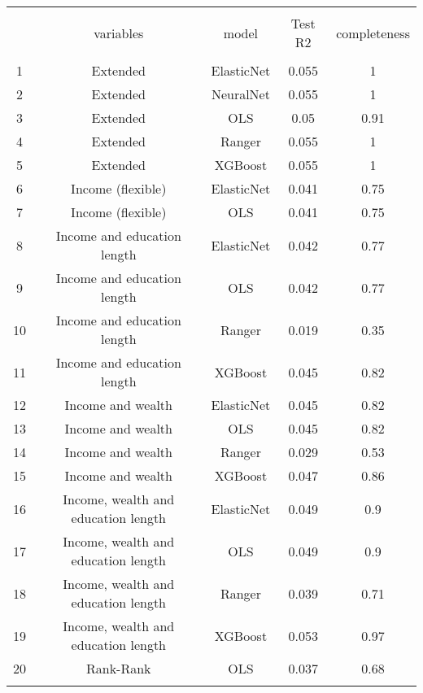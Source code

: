 
\begin{tabular}{@{\extracolsep{5pt}} ccccc} 
\\[-1.8ex]\hline 
\hline \\[-1.8ex] 
 & variables & model & Test R2 & completeness \\ 
\hline \\[-1.8ex] 
1 & Extended & ElasticNet & 0.055 & 1 \\ 
2 & Extended & NeuralNet & 0.055 & 1 \\ 
3 & Extended & OLS & 0.05 & 0.91 \\ 
4 & Extended & Ranger & 0.055 & 1 \\ 
5 & Extended & XGBoost & 0.055 & 1 \\ 
6 & Income (flexible) & ElasticNet & 0.041 & 0.75 \\ 
7 & Income (flexible) & OLS & 0.041 & 0.75 \\ 
8 & Income and education length & ElasticNet & 0.042 & 0.77 \\ 
9 & Income and education length & OLS & 0.042 & 0.77 \\ 
10 & Income and education length & Ranger & 0.019 & 0.35 \\ 
11 & Income and education length & XGBoost & 0.045 & 0.82 \\ 
12 & Income and wealth & ElasticNet & 0.045 & 0.82 \\ 
13 & Income and wealth & OLS & 0.045 & 0.82 \\ 
14 & Income and wealth & Ranger & 0.029 & 0.53 \\ 
15 & Income and wealth & XGBoost & 0.047 & 0.86 \\ 
16 & Income, wealth and education length & ElasticNet & 0.049 & 0.9 \\ 
17 & Income, wealth and education length & OLS & 0.049 & 0.9 \\ 
18 & Income, wealth and education length & Ranger & 0.039 & 0.71 \\ 
19 & Income, wealth and education length & XGBoost & 0.053 & 0.97 \\ 
20 & Rank-Rank & OLS & 0.037 & 0.68 \\ 
\hline \\[-1.8ex] 
\end{tabular} 
